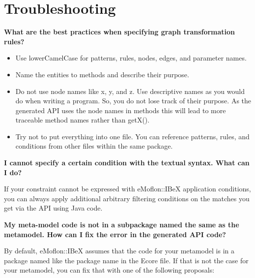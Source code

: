 \section{Troubleshooting}

\textbf{What are the best practices when specifying graph transformation rules?}

\begin{itemize}

    \item Use lowerCamelCase for patterns, rules, nodes, edges, and parameter names.
    
    \item Name the entities to methods and describe their purpose.
    
    \item Do not use node names like x, y, and z. Use descriptive names as you would do when writing a program. So, you do not lose track of their purpose. As the generated API uses the node names in methods this will lead to more traceable method names rather than getX().
    
    \item Try not to put everything into one file. You can reference patterns, rules, and conditions from other files within the same package.\newline
    
\end{itemize}

\textbf{I cannot specify a certain condition with the textual syntax. What can I do?}\newline

If your constraint cannot be expressed with eMoflon::IBeX application conditions, you can always apply additional arbitrary filtering conditions on the matches you get via the API using Java code.\newline\newline

\textbf{My meta-model code is not in a subpackage named the same as the metamodel. How can I fix the error in the generated API code?}\newline

By default, eMoflon::IBeX assumes that the code for your metamodel is in a package named like the package name in the Ecore file. If that is not the case for your metamodel, you can fix that with one of the following proposals:

